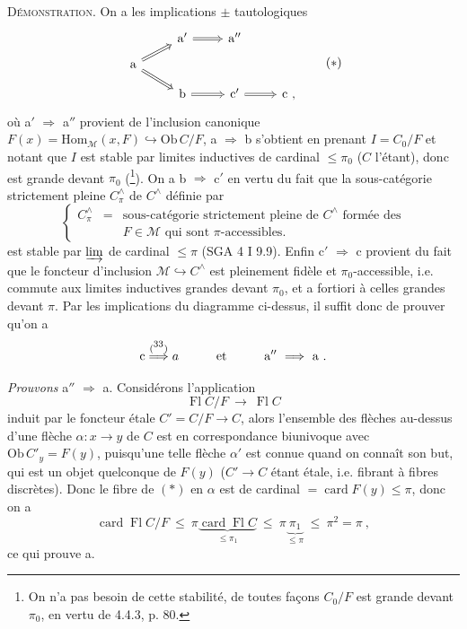 \documentclass[11pt]{article}
\newcommand{\printedpage}[1]{\if\relax\detokenize{#1}\relax\else\marginpar{\footnotesize p.~#1}\fi}
\newcommand{\msp}[1]{\marginpar{\footnotesize [#1]}}
\newcommand{\Hom}{\mathrm{Hom}}
\newcommand{\Ob}{\mathrm{Ob}\,}
\newcommand{\card}{\operatorname{card}}
\newcommand{\Fl}{\operatorname{Fl}}
\begin{document}
\textsc{Démonstration}. On a les implications $\pm$ tautologiques
\[
\begin{tikzcd}[row sep=small]
 & \mathrm{a}' \arrow[r, Rightarrow] & \mathrm{a}'' & \\
\mathrm{a} \arrow[ur, Rightarrow] \arrow[dr, Rightarrow] & & & \\
 & \mathrm{b} \arrow[r, Rightarrow] & \mathrm{c}' \arrow[r, Rightarrow] & \mathrm{c}\ ,
\end{tikzcd}
\tag*{$(*)$}
\]
\printedpage{30}
où a$'$ $\Longrightarrow$ a$''$ provient de l'inclusion canonique $F(x) = \Hom_{\mathcal{M}}(x,F) \hookrightarrow \Ob C/F$, a $\Longrightarrow$ b s'obtient en prenant $I = C_0/F$ et notant que $I$ est stable par limites inductives de cardinal $\leqslant \pi_0$ ($C$ l'étant), donc est grande devant $\pi_0$ (\footnote{On n'a pas besoin de cette stabilité, de toutes façons $C_0/F$ est grande devant $\pi_0$, en vertu de 4.4.3, p. 80.}). On a b $\Longrightarrow$ c$'$ en vertu du fait que la sous-catégorie strictement pleine $C^{\wedge}_{\pi}$ de $C^{\wedge}$ définie par
\[
\left\{
\begin{array}{lcl}
C^{\wedge}_{\pi} & = & \text{sous-catégorie strictement pleine de } C^{\wedge} \text{ formée des}\\
 & & F \in \mathcal{M} \text{ qui sont } \pi\text{-accessibles.}
\end{array}
\right.
\tag*{(4.5.2.2)}
\]
est stable par $\varinjlim$ de cardinal $\leqslant \pi$ (SGA 4 I 9.9). Enfin c$'$ $\Longrightarrow$ c provient du fait que le foncteur d'inclusion $\mathcal{M} \hookrightarrow C^{\wedge}$ est pleinement fidèle et $\pi_0$-accessible, i.e. commute aux limites inductives grandes devant $\pi_0$, et a fortiori à celles grandes devant $\pi$. Par les implications du diagramme ci-dessus, il suffit donc de prouver qu'on a
\[
\mathrm{c} \overset{(\mbox{\footnotemark[33]})}{\Longrightarrow} a \qquad\quad \text{et} \qquad\quad \mathrm{a}'' \ \Longrightarrow\ \mathrm{a}\ .
\]
\setcounter{footnote}{33}

\msp{page 109}

\textit{Prouvons} a$''$ $\Longrightarrow$ a. Considérons l'application
\[
\Fl C/F \ \longrightarrow\ \Fl C
\tag*{$(*)$}
\]
induit par le foncteur étale $C' = C/F \longrightarrow C$, alors l'ensemble des flèches au-dessus d'une %
flèche $\alpha : x \longrightarrow y$ de $C$ est en correspondance biunivoque avec $\Ob C'_y = F(y)$, puisqu'une telle flèche $\alpha'$ est connue quand on connaît son but, qui est un objet quelconque de $F(y)$ ($C' \longrightarrow C$ étant étale, i.e. fibrant à fibres discrètes). Donc le fibre de $(*)$ en $\alpha$ est de %
cardinal $= \card F(y) \leqslant \pi$, donc on a
\[
\card\Fl C/F \ \leqslant\ \pi \underbrace{\card\Fl C}_{\leqslant \pi_1} \ \leqslant\ \pi \underbrace{\ \pi_1\ }_{\leqslant \pi} \ \leqslant\ \pi^2 = \pi\ ,
\]
ce qui prouve a.
\end{document}
